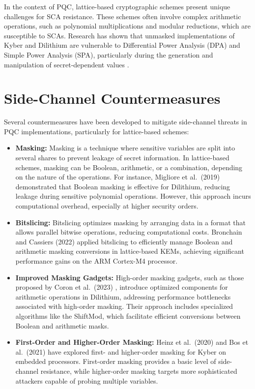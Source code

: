 In the context of \ac{PQC}, lattice-based cryptographic schemes present unique challenges for \ac{SCA} resistance. These schemes often involve complex arithmetic operations, such as polynomial multiplications and modular reductions, which are susceptible to \acp{SCA}. Research has shown that unmasked implementations of Kyber and Dilithium are vulnerable to Differential Power Analysis (\ac{DPA}) and Simple Power Analysis (\ac{SPA}), particularly during the generation and manipulation of secret-dependent values \cite{Bos21}.

\section{Side-Channel Countermeasures}

Several countermeasures have been developed to mitigate side-channel threats in \ac{PQC} implementations, particularly for lattice-based schemes:

\begin{itemize}
    \item \textbf{Masking:} Masking is a technique where sensitive variables are split into several shares to prevent leakage of secret information. In lattice-based schemes, masking can be Boolean, arithmetic, or a combination, depending on the nature of the operations. For instance, Migliore et al.\ (2019) \cite{Migliore19} demonstrated that Boolean masking is effective for Dilithium, reducing leakage during sensitive polynomial operations. However, this approach incurs computational overhead, especially at higher security orders.
    \item \textbf{Bitslicing:} Bitslicing optimizes masking by arranging data in a format that allows parallel bitwise operations, reducing computational costs. Bronchain and Cassiers (2022) \cite{Bronchain22} applied bitslicing to efficiently manage Boolean and arithmetic masking conversions in lattice-based \acp{KEM}, achieving significant performance gains on the \ac{ARM} Cortex-M4 processor.
    \item \textbf{Improved Masking Gadgets:} High-order masking gadgets, such as those proposed by Coron et al.\ (2023) \cite{Coron23}, introduce optimized components for arithmetic operations in Dilithium, addressing performance bottlenecks associated with high-order masking. Their approach includes specialized algorithms like the ShiftMod, which facilitate efficient conversions between Boolean and arithmetic masks.
    \item \textbf{First-Order and Higher-Order Masking:} Heinz et al.\ (2020) \cite{Heinz20} and Bos et al.\ (2021) \cite{Bos21} have explored first- and higher-order masking for Kyber on embedded processors. First-order masking provides a basic level of side-channel resistance, while higher-order masking targets more sophisticated attackers capable of probing multiple variables.
\end{itemize}

